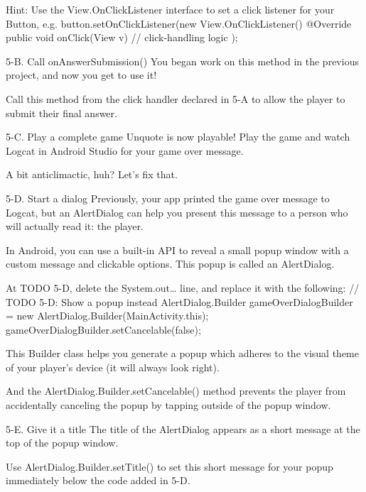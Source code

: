                         Hint: Use the View.OnClickListener interface to set a click listener for your Button, e.g.
                                button.setOnClickListener(new View.OnClickListener() {
                                        @Override
                                        public void onClick(View v) {
                                                // click-handling logic
                                        }
                                });

        5-B. Call onAnswerSubmission()
                You began work on this method in the previous project, and now you get to use it!

                Call this method from the click handler declared in 5-A to allow the player to submit their final answer.

                5-C. Play a complete game
                Unquote is now playable! Play the game and watch Logcat in Android Studio for your game over message.

                A bit anticlimactic, huh? Let’s fix that.

        5-D. Start a dialog
                Previously, your app printed the game over message to Logcat, but an AlertDialog can help you present this message to a person who will actually read it: the player.

                In Android, you can use a built-in API to reveal a small popup window with a custom message and clickable options. This popup is called an AlertDialog.

                At TODO 5-D, delete the System.out… line, and replace it with the following:
                        // TODO 5-D: Show a popup instead
                        AlertDialog.Builder gameOverDialogBuilder = new AlertDialog.Builder(MainActivity.this);
                        gameOverDialogBuilder.setCancelable(false);

                This Builder class helps you generate a popup which adheres to the visual theme of your player’s device (it will always look right).

                And the AlertDialog.Builder.setCancelable() method prevents the player from accidentally canceling the popup by tapping outside of the popup window.

        5-E. Give it a title
                The title of the AlertDialog appears as a short message at the top of the popup window.

                Use AlertDialog.Builder.setTitle() to set this short message for your popup immediately below the code added in 5-D.

